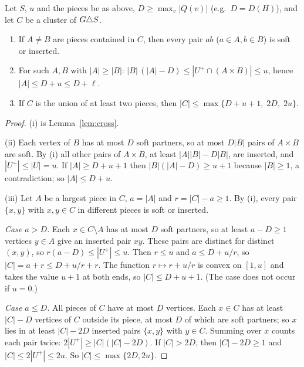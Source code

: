 \begin{lemma}\label{lem:SM}
Let $S$, $u$ and the pieces be as above, $D\ge\max_v|Q(v)|$ (e.g.\ $D=D(H)$), and let $C$ be a cluster of $G\triangle S$.
\begin{enumerate}
\item[(i)] If $A\ne B$ are pieces contained in $C$, then every pair $ab$ ($a\in A,b\in B$) is soft or inserted.
\item[(ii)] For such $A,B$ with $|A|\ge|B|$: $|B|\,(|A|-D)\le|U^+\cap(A\times B)|\le u$, hence $|A|\le D+u\le D+\ell$.
\item[(iii)] If $C$ is the union of at least two pieces, then $|C|\le\max\{D+u+1,\;2D,\;2u\}$.
\end{enumerate}
\end{lemma}
\begin{proof}
(i) is Lemma~\ref{lem:cross}.

(ii) Each vertex of $B$ has at most $D$ soft partners, so at most $D|B|$ pairs of $A\times B$ are soft. By (i) all other pairs of $A\times B$, at least $|A||B|-D|B|$, are inserted, and $|U^+|\le|U|=u$. If $|A|\ge D+u+1$ then $|B|(|A|-D)\ge u+1$ because $|B|\ge1$, a contradiction; so $|A|\le D+u$.

(iii) Let $A$ be a largest piece in $C$, $a=|A|$ and $r=|C|-a\ge1$. By (i), every pair $\{x,y\}$ with $x,y\in C$ in different pieces is soft or inserted.

\emph{Case $a>D$.} Each $x\in C\setminus A$ has at most $D$ soft partners, so at least $a-D\ge1$ vertices $y\in A$ give an inserted pair $xy$. These pairs are distinct for distinct $(x,y)$, so $r(a-D)\le|U^+|\le u$. Then $r\le u$ and $a\le D+u/r$, so $|C|=a+r\le D+u/r+r$. The function $r\mapsto r+u/r$ is convex on $[1,u]$ and takes the value $u+1$ at both ends, so $|C|\le D+u+1$. (The case does not occur if $u=0$.)

\emph{Case $a\le D$.} All pieces of $C$ have at most $D$ vertices. Each $x\in C$ has at least $|C|-D$ vertices of $C$ outside its piece, at most $D$ of which are soft partners; so $x$ lies in at least $|C|-2D$ inserted pairs $\{x,y\}$ with $y\in C$. Summing over $x$ counts each pair twice: $2|U^+|\ge|C|(|C|-2D)$. If $|C|>2D$, then $|C|-2D\ge1$ and $|C|\le2|U^+|\le2u$. So $|C|\le\max\{2D,2u\}$.
\end{proof}
